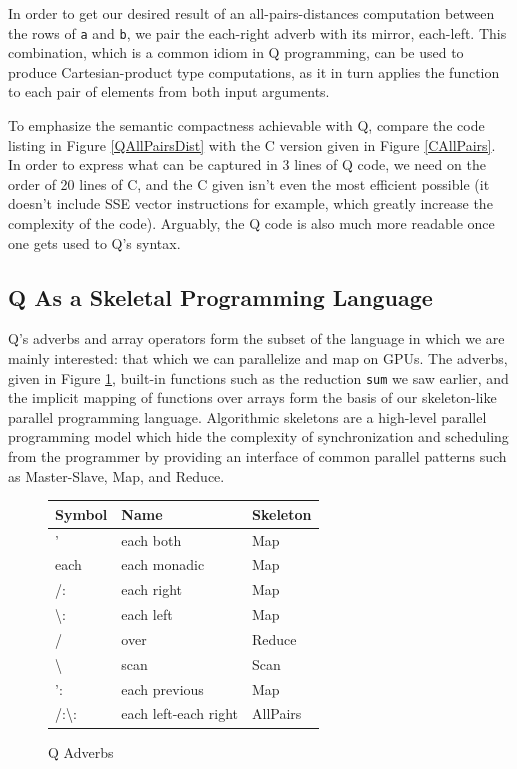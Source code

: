 \documentclass[preprint]{sigplanconf}
\begin{document}
In order to get our desired result of an all-pairs-distances computation between the rows of \texttt{a} and \texttt{b}, we pair the each-right adverb with its mirror, each-left.  This combination, which is a common idiom in Q programming, can be used to produce Cartesian-product type computations, as it in turn applies the function to each pair of elements from both input arguments.

To emphasize the semantic compactness achievable with Q, compare the code listing in Figure \ref{QAllPairsDist} with the C version given in Figure \ref{CAllPairs}.  In order to express what can be captured in 3 lines of Q code, we need on the order of 20 lines of C, and the C given isn't even the most efficient possible (it doesn't include SSE vector instructions for example, which greatly increase the complexity of the code).  Arguably, the Q code is also much more readable once one gets used to Q's syntax.

\subsection{Q As a Skeletal Programming Language}
Q's adverbs and array operators form the subset of the language in which we are mainly interested: that which we can parallelize and map on GPUs.  The adverbs, given in Figure \ref{QAdverbs}, built-in functions such as the reduction \texttt{sum} we saw earlier, and the implicit mapping of functions over arrays form the basis of our skeleton-like parallel programming language.  Algorithmic skeletons \cite{Cole04} are a high-level parallel programming model which hide the complexity of synchronization and scheduling from the programmer by providing an interface of common parallel patterns such as Master-Slave, Map, and Reduce.

\begin{figure}
\centering
\begin{tabular}{|l|l|l|}
\hline Symbol & Name & Skeleton\\
\hline ' & each both & Map \\
\hline each & each monadic & Map \\
\hline /: & each right & Map \\
\hline \textbackslash: & each left & Map\\
\hline / & over & Reduce \\
\hline \textbackslash & scan & Scan \\
\hline ': & each previous & Map \\
\hline /:\textbackslash: & each left-each right & AllPairs \\
\hline
\end{tabular}
\caption{Q Adverbs}
\label{QAdverbs}
\end{figure}
\end{document}
